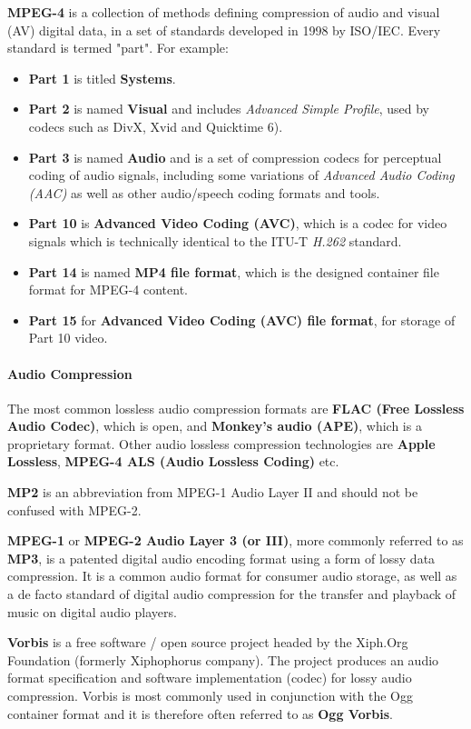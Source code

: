 \textbf{MPEG-4} is a collection of methods defining compression of audio and
visual (AV) digital data, in a set of standards developed in 1998 by ISO/IEC.
Every standard is termed "part". For example:
\begin{itemize}
  \item \textbf{Part 1} is titled \textbf{Systems}.
  \item \textbf{Part 2} is named \textbf{Visual} and includes \textit{Advanced
  Simple Profile}, used by codecs such as DivX, Xvid and Quicktime 6).
  \item \textbf{Part 3} is named \textbf{Audio} and is a set of compression
  codecs for perceptual coding of audio signals, including some variations of
  \textit{Advanced Audio Coding (AAC)} as well as other audio/speech coding
  formats and tools.
  \item \textbf{Part 10} is \textbf{Advanced Video Coding (AVC)}, which is a
  codec for video signals which is technically identical to the ITU-T
  \textit{H.262} standard.
  \item \textbf{Part 14} is named \textbf{MP4 file format}, which is the
  designed container file format for MPEG-4 content.
  \item \textbf{Part 15} for \textbf{Advanced Video Coding (AVC) file format},
  for storage of Part 10 video.
\end{itemize}

\paragraph{Audio Compression}

The most common lossless audio compression formats are \textbf{FLAC (Free
Lossless Audio Codec)}, which is open, and \textbf{Monkey's audio (APE)},
which is a proprietary format. Other audio lossless compression technologies
are \textbf{Apple Lossless}, \textbf{MPEG-4 ALS (Audio Lossless Coding)} etc.

\textbf{MP2} is an abbreviation from MPEG-1 Audio Layer II and should not be
confused with MPEG-2.

\textbf{MPEG-1} or \textbf{MPEG-2 Audio Layer 3 (or III)}, more commonly
referred to as \textbf{MP3}, is a patented digital audio encoding format using
a form of lossy data compression. It is a common audio format for consumer
audio storage, as well as a de facto standard of digital audio compression for
the transfer and playback of music on digital audio players.

\textbf{Vorbis} is a free software / open source project headed by the
Xiph.Org Foundation (formerly Xiphophorus company). The project produces an
audio format specification and software implementation (codec) for lossy audio
compression. Vorbis is most commonly used in conjunction with the Ogg
container format and it is therefore often referred to as \textbf{Ogg Vorbis}.

